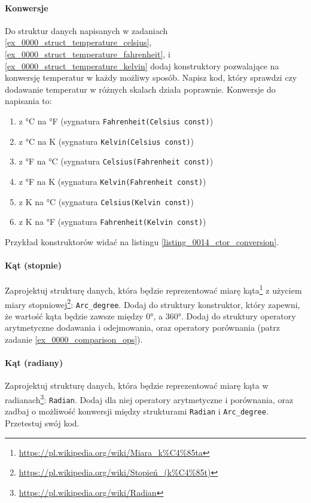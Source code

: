 \documentclass[11pt,a4paper,titlepage,onecolumn]{article}
\begin{document}
\paragraph{Konwersje} Do struktur danych napisanych w zadaniach
\ref{ex_0000_struct_temperature_celsius},
\ref{ex_0000_struct_temperature_fahrenheit}, i
\ref{ex_0000_struct_temperature_kelvin} dodaj konstruktory pozwalające na
konwersję temperatur w każdy możliwy sposób. Napisz kod, który sprawdzi czy
dodawanie temperatur w różnych skalach działa poprawnie. Konwersje do napisania
to:
\begin{enumerate}
    \item z °C na °F (sygnatura \texttt{Fahrenheit(Celsius const)})
    \item z °C na K (sygnatura \texttt{Kelvin(Celsius const)})
    \item z °F na °C (sygnatura \texttt{Celsius(Fahrenheit const)})
    \item z °F na K (sygnatura \texttt{Kelvin(Fahrenheit const)})
    \item z K na °C (sygnatura \texttt{Celsius(Kelvin const)})
    \item z K na °F (sygnatura \texttt{Fahrenheit(Kelvin const)})
\end{enumerate}
Przykład konstruktorów widać na listingu \ref{listing_0014_ctor_conversion}.

\paragraph{Kąt (stopnie)} Zaprojektuj strukturę danych, która będzie reprezentować miarę
kąta\footnote{\url{https://pl.wikipedia.org/wiki/Miara_k\%C4\%85ta}} z użyciem miary
stopniowej\footnote{\url{https://pl.wikipedia.org/wiki/Stopień_(k\%C4\%85t)}}:
\texttt{Arc\_degree}.
Dodaj do struktury konstruktor, który zapewni, że wartość kąta będzie zawsze
między 0°, a 360°. Dodaj do struktury operatory arytmetyczne dodawania i
odejmowania, oraz operatory porównania (patrz zadanie
\ref{ex_0000_comparison_ops}).

\paragraph{Kąt (radiany)} Zaprojektuj strukturę danych, która będzie reprezentować
miarę kąta w radianach\footnote{\url{https://pl.wikipedia.org/wiki/Radian}}:
\texttt{Radian}. Dodaj dla niej operatory arytmetyczne i porównania, oraz zadbaj
o możliwość konwersji między strukturami \texttt{Radian} i \texttt{Arc\_degree}.
Przetestuj swój kod.
\end{document}
